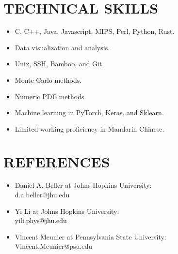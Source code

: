 \documentclass[margin, 10pt]{res} %
\begin{document}
\begin{resume}
\section{TECHNICAL SKILLS} 
\begin{itemize}
    \item C, C++, Java, Javascript, MIPS, Perl, Python, Rust.
    \item Data visualization and analysis.
    \item Unix, SSH, Bamboo, and Git.
    \item Monte Carlo methods.
    \item Numeric PDE methods.
    \item Machine learning in PyTorch, Keras, and Sklearn. 
    \item Limited working proficiency in Mandarin Chinese.
\end{itemize} 
\section{REFERENCES}
\begin{itemize}
    \item Daniel A. Beller at Johns Hopkins University:\\
    d.a.beller@jhu.edu
    \item Yi Li at Johns Hopkins University:\\
    yili.phys@jhu.edu
    \item Vincent Meunier at Pennsylvania State University:\\
    Vincent.Meunier@psu.edu
\end{itemize}

\end{resume}
\end{document}
